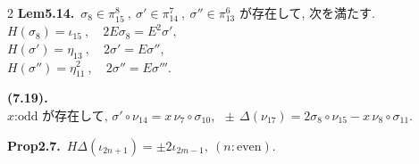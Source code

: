 \documentclass[10pt, leqno]{ltjsarticle}
\numberwithin{equation}{section}
\theoremstyle{plain}
\theoremstyle{definition}
\theoremstyle{remark}
\begin{document}
\begin{paracol}{2}
\noindent
\textbf{Lem5.14.}\
\(\sigma_{8}\in\pi^{8}_{15}\ , \ \sigma'\in\pi^{7}_{14}\ , \ \sigma''\in\pi^{6}_{13}\) 
が存在して, 次を満たす. \\
\(H(\sigma_{8})=\iota_{15} \ ,\quad 2E\sigma_{8}=E^{2}\sigma',\)\\
\(H(\sigma')=\eta_{13} \ ,\quad 2\sigma'=E\sigma'',\)\\
\(H(\sigma'')=\eta_{11}^2 \ ,\quad 2\sigma''=E\sigma''' .\)

\noindent
\textbf{(7.19).}\
\(x \text{:odd が存在して, }
\sigma'\circ \nu_{14}=x\,\nu_{7}\circ\sigma_{10},\ \
\pm\,\Delta(\nu_{17})=2\sigma_{8}\circ \nu_{15}-x\,\nu_{8}\circ\sigma_{11} .\)

\noindent
\textbf{Prop2.7.}\
\(H\Delta(\iota_{2n+1}) = \pm2\iota_{2m-1},\ (n:\text{even})\).





\end{paracol}
\end{document}
